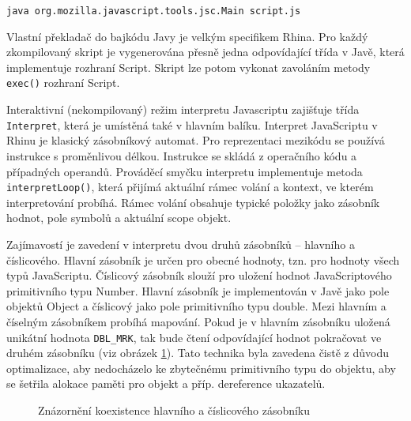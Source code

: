 \centerline{\texttt{java org.mozilla.javascript.tools.jsc.Main script.js}}

Vlastní překladač do bajkódu Javy je velkým specifikem Rhina. Pro každý zkompilovaný skript je vygenerována přesně jedna odpovídající třída v Javě, která implementuje rozhraní Script. Skript lze potom vykonat zavoláním metody \texttt{exec()} rozhraní Script.

Interaktivní (nekompilovaný) režim interpretu Javascriptu zajišťuje třída \texttt{Interpret}, která je umístěná také v hlavním balíku. Interpret JavaScriptu v Rhinu je klasický zásobníkový automat. Pro reprezentaci mezikódu se používá instrukce s proměnlivou délkou. Instrukce se skládá z operačního kódu a případných operandů. Prováděcí smyčku interpretu implementuje metoda \texttt{interpretLoop()}, která přijímá aktuální rámec volání a kontext, ve kterém interpretování probíhá. Rámec volání obsahuje typické položky jako zásobník hodnot, pole symbolů a aktuální scope objekt.

Zajímavostí je zavedení v interpretu dvou druhů zásobníků – hlavního a číslicového. Hlavní zásobník je určen pro obecné hodnoty, tzn. pro hodnoty všech typů JavaScriptu. Číslicový zásobník slouží pro uložení hodnot JavaScriptového primitivního typu Number. Hlavní zásobník je implementován v Javě jako pole objektů Object a číslicový jako pole primitivního typu double. Mezi hlavním a číselným zásobníkem probíhá mapování. Pokud je v hlavním zásobníku uložená unikátní hodnota \texttt{DBL\_MRK}, tak bude čtení odpovídající hodnot pokračovat ve druhém zásobníku (viz obrázek \ref{Figure.RhinoStack}). Tato technika byla zavedena čistě z důvodu optimalizace, aby nedocházelo ke zbytečnému  primitivního typu do objektu, aby se šetřila alokace paměti pro objekt a příp. dereference ukazatelů.

\begin{figure}[H]
  \begin{center}
    \caption{Znázornění koexistence hlavního a číslicového zásobníku}
    \label{Figure.RhinoStack}
  \end{center}
\end{figure}

